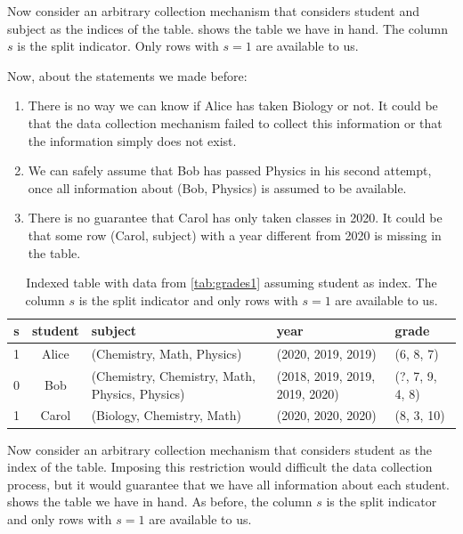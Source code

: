 Now consider an arbitrary collection mechanism that considers student and subject as the
indices of the table.   shows the table we have in hand.  The column $s$
is the split indicator.  Only rows with $s = 1$ are available to us.

Now, about the statements we made before:
\begin{enumerate}
  \itemsep0em
  \item There is no way we can know if Alice has taken Biology or not.  It could be that
    the data collection mechanism failed to collect this information or that the
    information simply does not exist.
  \item We can safely assume that Bob has passed Physics in his second attempt, once all
    information about (Bob, Physics) is assumed to be available.
  \item There is no guarantee that Carol has only taken classes in 2020.  It could be that
    some row (Carol, subject) with a year different from 2020 is missing in the table.
\end{enumerate}

\begin{table}
  \centering
  \begin{tabular}{ccp{2.6cm}p{1.8cm}>{\raggedright\arraybackslash}p{1.2cm}}
    \toprule
    \textbf{s} & \textbf{student} & \textbf{subject} & \textbf{year} & \textbf{grade} \\
    \midrule
    1 & Alice & (Chemistry, Math, Physics) & (2020, 2019, 2019) & (6, 8, 7) \\
    0 & Bob & (Chemistry, Chemistry, Math, Physics, Physics) & (2018, 2019, 2019, 2019, 2020) & (?, 7, 9, 4, 8) \\
    1 & Carol & (Biology, Chemistry, Math) & (2020, 2020, 2020) & (8, 3, 10) \\
    \bottomrule
  \end{tabular}
  \caption{
  Indexed table with data from \cref{tab:grades1} assuming student
  as index.  The column $s$ is the split indicator and only rows with $s = 1$ are available to us.
  }
  \label{tab:grades3}
\end{table}

Now consider an arbitrary collection mechanism that considers student as the index of the table.
Imposing this restriction would difficult the data collection process, but it would
guarantee that we have all information about each student.   shows the
table we have in hand.  As before, the column $s$ is the split indicator and only rows with
$s = 1$ are available to us.

